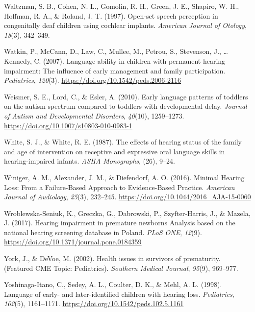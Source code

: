 \documentclass[english,man]{apa6}
\begin{document}
\leavevmode\hypertarget{ref-waltzman1997}{}%
Waltzman, S. B., Cohen, N. L., Gomolin, R. H., Green, J. E., Shapiro, W. H., Hoffman, R. A., \& Roland, J. T. (1997). Open-set speech perception in congenitally deaf children using cochlear implants. \emph{American Journal of Otology}, \emph{18}(3), 342--349.

\leavevmode\hypertarget{ref-watkin2007}{}%
Watkin, P., McCann, D., Law, C., Mullee, M., Petrou, S., Stevenson, J., \ldots{} Kennedy, C. (2007). Language ability in children with permanent hearing impairment: The influence of early management and family participation. \emph{Pediatrics}, \emph{120}(3). \url{https://doi.org/10.1542/peds.2006-2116}

\leavevmode\hypertarget{ref-weismer2010}{}%
Weismer, S. E., Lord, C., \& Esler, A. (2010). Early language patterns of toddlers on the autism spectrum compared to toddlers with developmental delay. \emph{Journal of Autism and Developmental Disorders}, \emph{40}(10), 1259--1273. \url{https://doi.org/10.1007/s10803-010-0983-1}

\leavevmode\hypertarget{ref-white1987}{}%
White, S. J., \& White, R. E. (1987). The effects of hearing status of the family and age of intervention on receptive and expressive oral language skills in hearing-impaired infants. \emph{ASHA Monographs}, (26), 9--24.

\leavevmode\hypertarget{ref-winiger2016}{}%
Winiger, A. M., Alexander, J. M., \& Diefendorf, A. O. (2016). Minimal Hearing Loss: From a Failure-Based Approach to Evidence-Based Practice. \emph{American Journal of Audiology}, \emph{25}(3), 232--245. \url{https://doi.org/10.1044/2016_AJA-15-0060}

\leavevmode\hypertarget{ref-wroblewska-seniuk2017}{}%
Wroblewska-Seniuk, K., Greczka, G., Dabrowski, P., Szyfter-Harris, J., \& Mazela, J. (2017). Hearing impairment in premature newborns Analysis based on the national hearing screening database in Poland. \emph{PLoS ONE}, \emph{12}(9). \url{https://doi.org/10.1371/journal.pone.0184359}

\leavevmode\hypertarget{ref-york2002}{}%
York, J., \& DeVoe, M. (2002). Health issues in survivors of prematurity. (Featured CME Topic: Pediatrics). \emph{Southern Medical Journal}, \emph{95}(9), 969--977.

\leavevmode\hypertarget{ref-yoshinaga-itano1998}{}%
Yoshinaga-Itano, C., Sedey, A. L., Coulter, D. K., \& Mehl, A. L. (1998). Language of early- and later-identified children with hearing loss. \emph{Pediatrics}, \emph{102}(5), 1161--1171. \url{https://doi.org/10.1542/peds.102.5.1161}
\end{document}
